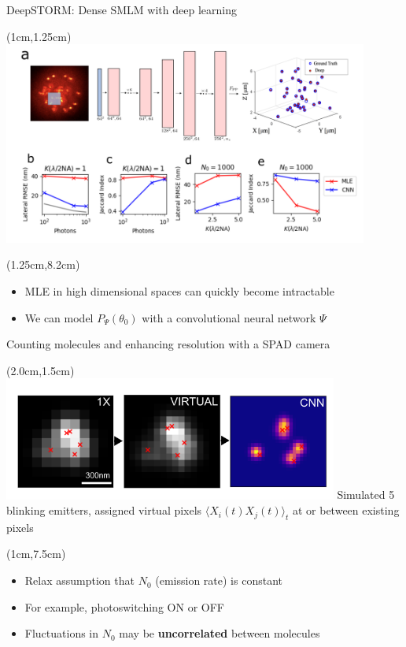 \documentclass{beamer}					%
\begin{document}
\begin{frame}{DeepSTORM: Dense SMLM with deep learning}

\begin{textblock*}{12cm}(1cm,1.25cm)
\includegraphics[width=12cm]{PSF2D.png}
\end{textblock*}
\begin{textblock*}{12cm}(1.25cm,8.2cm)
\begin{itemize}
\item MLE in high dimensional spaces can quickly become intractable
\item We can model $P_{\Psi}(\theta_{0})$ with a convolutional neural network $\Psi$
\end{itemize}
\end{textblock*}

\end{frame}

\begin{frame}{Counting molecules and enhancing resolution with a SPAD camera}

\begin{textblock*}{11cm}(2.0cm,1.5cm)
\includegraphics[width=11cm]{Doubled-cNN.png}
Simulated 5 blinking emitters, assigned virtual pixels $\langle X_{i}(t)X_{j}(t) \rangle_{t}$ at or between existing pixels
\end{textblock*}

\begin{textblock*}{11cm}(1cm,7.5cm)
\begin{itemize}
\item Relax assumption that $N_{0}$ (emission rate) is constant 
\item For example, photoswitching \textrm{ON} or \textrm{OFF}
\item Fluctuations in $N_{0}$ may be \textbf{uncorrelated} between molecules
\end{itemize}

\end{textblock*}

\end{frame}
\end{document}
